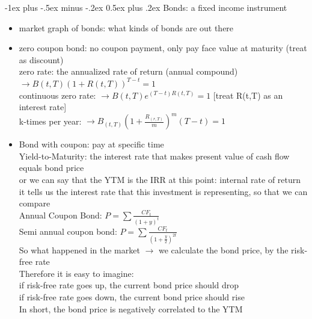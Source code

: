\documentclass[10pt,landscape]{article}
\makeatletter
\renewcommand{\section}{\@startsection{section}{1}{0mm}%
                                {-1ex plus -.5ex minus -.2ex}%
                                {0.5ex plus .2ex}%
                                {\normalfont\large\bfseries}}
\makeatother
\begin{document}
\begin{multicols}{2}
\section{Bonds: a fixed income instrument}
\begin{itemize}
	\item market graph of bonds: what kinds of bonds are out there
	\item zero coupon bond: no coupon payment, only pay face value at maturity (treat as discount)\\
			zero rate: the annualized rate of return (annual compound) $\longrightarrow B(t,T)(1+R(t,T))^{T-t} = 1$\\
			continuous zero rate: $\longrightarrow B(t,T)e^{(T-t)R(t,T)} = 1$   [treat R(t,T) as an interest rate]\\
			k-times per year: $\longrightarrow B_{(t,T)}(1+\frac{R_{(r,T)}}{m} )^m(T-t) = 1$
	\item Bond with coupon: pay at specific time\\
			
			Yield-to-Maturity: the interest rate that makes present value of cash flow equals bond price\\
			or we can say that the YTM is the IRR at this point: internal rate of return\\
			it tells us the interest rate that this investment is representing, so that we can compare\\
			
			Annual Coupon Bond: $P = \sum \frac{CF_t}{(1+y)^t}$\\
			Semi annual coupon bond: $P = \sum \frac{CF_t}{(1+\frac{y}{2	} )^{2t}}$\\
			
			So what happened in the market $\longrightarrow$ we calculate the bond price, by the risk-free rate\\
			Therefore it is easy to imagine: \\
			if risk-free rate goes up, the current bond price should drop\\
			if risk-free rate goes down, the current bond price should rise\\
			In short, the bond price is negatively correlated to the YTM\\
			

\end{itemize}
\end{multicols}
\end{document}
